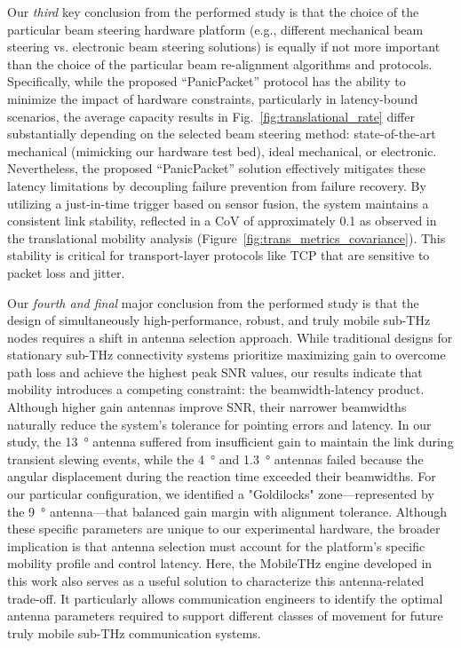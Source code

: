 \documentclass[fleqn,10pt]{wlscirep}
\begin{document}
Our \emph{third} key conclusion from the performed study is that the choice of the particular beam steering hardware platform (e.g., different mechanical beam steering vs. electronic beam steering solutions) is equally if not more important than the choice of the particular beam re-alignment algorithms and protocols. Specifically, while the proposed ``PanicPacket'' protocol has the ability to minimize the impact of hardware constraints, particularly in latency-bound scenarios, the average capacity results in Fig.~\ref{fig:translational_rate} differ substantially depending on the selected beam steering method: state-of-the-art mechanical (mimicking our hardware test bed), ideal mechanical, or electronic. Nevertheless, the proposed ``PanicPacket'' solution effectively mitigates these latency limitations by decoupling failure prevention from failure recovery. By utilizing a just-in-time trigger based on sensor fusion, the system maintains a consistent link stability, reflected in a CoV of approximately 0.1 as observed in the translational mobility analysis (Figure~\ref{fig:trans_metrics_covariance}). This stability is critical for transport-layer protocols like TCP that are sensitive to packet loss and jitter. 

Our \emph{fourth and final} major conclusion from the performed study is that the design of simultaneously high-performance, robust, and truly mobile sub-THz nodes requires a shift in antenna selection approach. While traditional designs for stationary sub-THz connectivity systems prioritize maximizing gain to overcome path loss and achieve the highest peak SNR values, our results indicate that mobility introduces a competing constraint: the beamwidth-latency product. Although higher gain antennas improve SNR, their narrower beamwidths naturally reduce the system's tolerance for pointing errors and latency. In our study, the \SI{13}{\degree} antenna suffered from insufficient gain to maintain the link during transient slewing events, while the \SI{4}{\degree} and \SI{1.3}{\degree} antennas failed because the angular displacement during the reaction time exceeded their beamwidths. For our particular configuration, we identified a "Goldilocks" zone—represented by the \SI{9}{\degree} antenna—that balanced gain margin with alignment tolerance. Although these specific parameters are unique to our experimental hardware, the broader implication is that antenna selection must account for the platform's specific mobility profile and control latency. Here, the MobileTHz engine developed in this work also serves as a useful solution to characterize this antenna-related trade-off. It particularly allows communication engineers to identify the optimal antenna parameters required to support different classes of movement for future truly mobile sub-THz communication systems.
\end{document}
